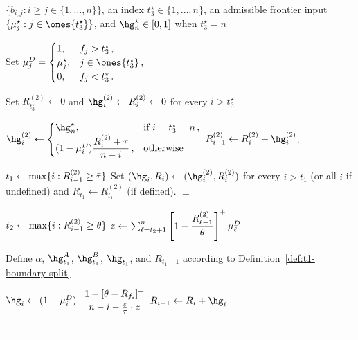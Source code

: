 \begin{algorithm}[H]
\caption{Construction of the profile $\hg$}\label{alg:general-case-procedure-hgi}
\begin{algorithmic}[1]
    \Require $\{b_{i,j} : i\ge j\in\{1,\dots,n\}\}$, an index $t_3^\star\in\{1,\dots,n\}$, an admissible frontier input $\{\mu_j^\star : j\in\ones{t_3^\star}\}$, and $\hg_n^\star\in[0,1]$ when $t_3^\star=n$

    \State Set
    $\mu_j^D=
    \begin{cases}
        1, & f_j>t_3^\star\,,\\
        \mu_j^\star, & j\in\ones{t_3^\star}\,,\\
        0, & f_j<t_3^\star\,.
    \end{cases}$

    \State Set $R_{t_3^\star}^{(2)}\gets 0$ and $\hg_i^{(2)}\gets R_i^{(2)}\gets 0$ for every $i>t_3^\star$

     \label{line:phase-2-loop}
        \State $\hg_i^{(2)}\gets
        \begin{cases}
            \hg_n^\star, & \text{if $i=t_3^\star=n$}\,,\\
            (1-\mu_i^D)\dfrac{R_i^{(2)}+\Mtone}{n-i}\,, & \text{otherwise}
        \end{cases}$
        \State $R_{i-1}^{(2)}\gets R_i^{(2)}+\hg_i^{(2)}$.
    \EndFor

    \State $t_1\gets \max\{i : R_{i-1}^{(2)}\ge \bar\tau\}$ \label{line:R_i-1-smaller-0.79-condition}
    \State Set $(\hg_i,R_i)\gets (\hg_i^{(2)},R_i^{(2)})$ for every $i>t_1$ (or all $i$ if undefined) and $R_{t_1}\gets R_{t_1}^{(2)}$ (if defined).
     \label{line:t_1-perp-condition}
        \State \Return $\perp$
    \EndIf

    \State $t_2\gets \max\{i : R_{i-1}^{(2)}\ge \theta\}$
    \State $z\gets \sum_{\ell=t_2+1}^{n}\left[1-\dfrac{R_{\ell-1}^{(2)}}{\theta}\right]^+\mu_\ell^D$

    \State Define $\alpha$, $\hg_{t_1}^A$, $\hg_{t_1}^B$, $\hg_{t_1}$, and $R_{t_1-1}$ according to Definition~\ref{def:t1-boundary-split}

        \State $\hg_i \gets (1-\mu_i^D)\cdot\dfrac{1-[\MRttwo-R_{f_i}]^+}{n-i-\Mfrac\cdot z}$
        \State $R_{i-1} \gets R_i + \hg_i$
    \EndFor

        \State \Return $\perp$
    \EndIf
\end{algorithmic}
\end{algorithm}

